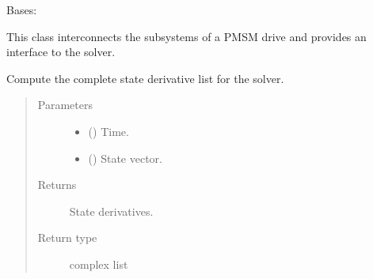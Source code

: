 \documentclass[letterpaper,10pt,english]{sphinxmanual}
\begin{document}

\begin{fulllineitems}
\label{\detokenize{model:model.sm_drive.Drive}}
\pysigstartsignatures
{}
\pysigstopsignatures
\sphinxAtStartPar
Bases: 

\sphinxAtStartPar
This class interconnects the subsystems of a PMSM drive and provides an
interface to the solver.

\begin{fulllineitems}
\label{\detokenize{model:model.sm_drive.Drive.f}}
\pysigstartsignatures
{}
\pysigstopsignatures
\sphinxAtStartPar
Compute the complete state derivative list for the solver.
\begin{quote}\begin{description}
\item[{Parameters}] \leavevmode\begin{itemize}
\item {} 
\sphinxAtStartPar
{} () \textendash{} Time.

\item {} 
\sphinxAtStartPar
{} () \textendash{} State vector.

\end{itemize}

\item[{Returns}] \leavevmode
\sphinxAtStartPar
State derivatives.

\item[{Return type}] \leavevmode
\sphinxAtStartPar
complex list

\end{description}\end{quote}

\end{fulllineitems}


\end{fulllineitems}
\end{document}
